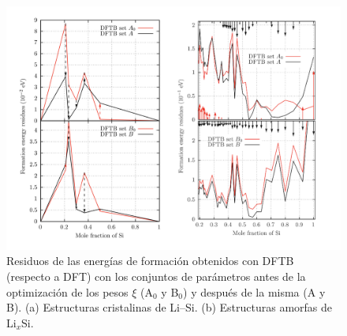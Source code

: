 \begin{figure}[h]
    \centering
    \includegraphics[width=\textwidth]{Silicio/modelo/resultados/residuos/residuos.png}
    \caption{Residuos de las energías de formación obtenidos con DFTB (respecto a
    DFT) con los conjuntos de parámetros antes de la optimización de los pesos 
    $\xi$ (A$_0$ y B$_0$) y después de la misma (A y B). (a) Estructuras
    cristalinas de Li--Si. (b) Estructuras amorfas de Li$_x$Si.}
    \label{fig:residuos}
\end{figure}
